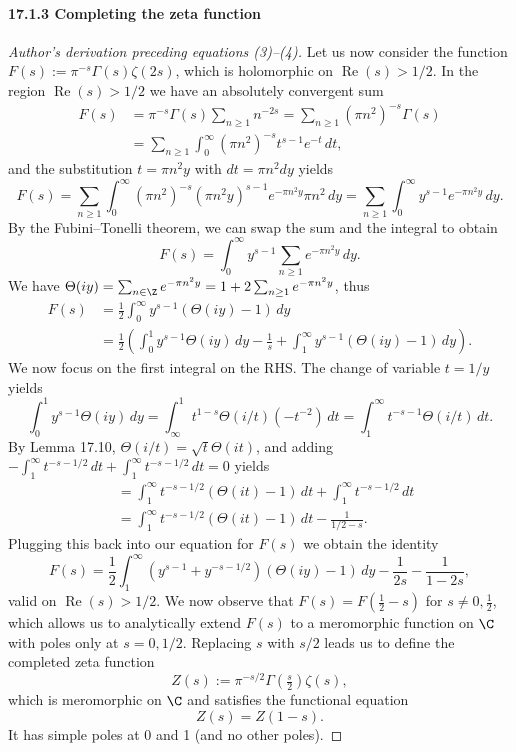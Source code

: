 \paragraph{17.1.3 Completing the zeta function}
\begin{proof}[Author's derivation preceding equations (3)--(4)]
Let us now consider the function $F(s):=\pi^{-s}\Gamma(s)\zeta(2s)$, which is holomorphic on $\operatorname{Re}(s)>1/2$. In the region $\operatorname{Re}(s)>1/2$ we have an absolutely convergent sum
\begin{align*}
F(s)&=\pi^{-s}\Gamma(s)\sum_{n\geq1}n^{-2s}
=\sum_{n\geq1}(\pi n^2)^{-s}\Gamma(s)\\
&=\sum_{n\geq1}\int_0^\infty(\pi n^2)^{-s}t^{s-1}e^{-t}\,dt,
\end{align*}
and the substitution $t=\pi n^2y$ with $dt=\pi n^2dy$ yields
\[
F(s)=\sum_{n\geq1}\int_0^\infty(\pi n^2)^{-s}(\pi n^2y)^{s-1}e^{-\pi n^2y}\pi n^2\,dy
=\sum_{n\geq1}\int_0^\infty y^{s-1}e^{-\pi n^2y}\,dy.
\]
By the Fubini--Tonelli theorem, we can swap the sum and the integral to obtain
\[
F(s)=\int_0^\infty y^{s-1}\sum_{n\geq1}e^{-\pi n^2y}\,dy.
\]
We have $\Theta(iy)=\sum_{n\in\Z}e^{-\pi n^2y}=1+2\sum_{n\geq1}e^{-\pi n^2y}$, thus
\begin{align*}
F(s)&=\frac12\int_0^\infty y^{s-1}(\Theta(iy)-1)\,dy\\
&=\frac12\left(\int_0^1y^{s-1}\Theta(iy)\,dy-\frac1s+\int_1^\infty y^{s-1}(\Theta(iy)-1)\,dy\right).
\end{align*}
We now focus on the first integral on the RHS. The change of variable $t=1/y$ yields
\[
\int_0^1y^{s-1}\Theta(iy)\,dy
=\int_\infty^1 t^{1-s}\Theta(i/t)(-t^{-2})\,dt
=\int_1^\infty t^{-s-1}\Theta(i/t)\,dt.
\]
By Lemma 17.10, $\Theta(i/t)=\sqrt t\Theta(it)$, and adding $-\int_1^\infty t^{-s-1/2}\,dt+\int_1^\infty t^{-s-1/2}\,dt=0$ yields
\begin{align*}
&=\int_1^\infty t^{-s-1/2}(\Theta(it)-1)\,dt+\int_1^\infty t^{-s-1/2}\,dt\\
&=\int_1^\infty t^{-s-1/2}(\Theta(it)-1)\,dt-\frac1{1/2-s}.
\end{align*}
Plugging this back into our equation for $F(s)$ we obtain the identity
\[
F(s)=\frac12\int_1^\infty(y^{s-1}+y^{-s-1/2})(\Theta(iy)-1)\,dy-\frac1{2s}-\frac1{1-2s},
\]
valid on $\operatorname{Re}(s)>1/2$. We now observe that $F(s)=F(\frac12-s)$ for $s\ne0,\frac12$, which allows us to analytically extend $F(s)$ to a meromorphic function on $\C$ with poles only at $s=0,1/2$. Replacing $s$ with $s/2$ leads us to define the completed zeta function
\[
Z(s):=\pi^{-s/2}\Gamma(\tfrac s2)\zeta(s),\tag{3}
\]
which is meromorphic on $\C$ and satisfies the functional equation
\[
Z(s)=Z(1-s).\tag{4}
\]
It has simple poles at 0 and 1 (and no other poles).
\end{proof}